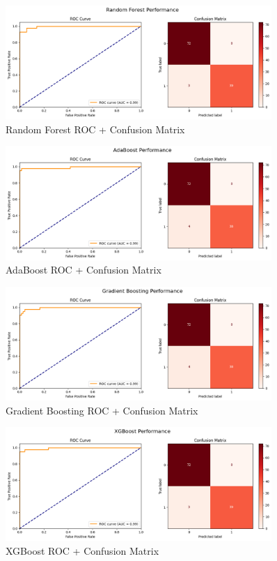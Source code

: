 \documentclass[12pt]{article}
\begin{document}
\begin{figure}[H]
\centering
\includegraphics[width=0.9\textwidth]{images/rf.png}
\caption{Random Forest ROC + Confusion Matrix}
\end{figure}

\begin{figure}[H]
\centering
\includegraphics[width=0.9\textwidth]{images/ab.png}
\caption{AdaBoost ROC + Confusion Matrix}
\end{figure}

\begin{figure}[H]
\centering
\includegraphics[width=0.9\textwidth]{images/gb.png}
\caption{Gradient Boosting ROC + Confusion Matrix}
\end{figure}

\begin{figure}[H]
\centering
\includegraphics[width=0.9\textwidth]{images/xb.png}
\caption{XGBoost ROC + Confusion Matrix}
\end{figure}
\end{document}
